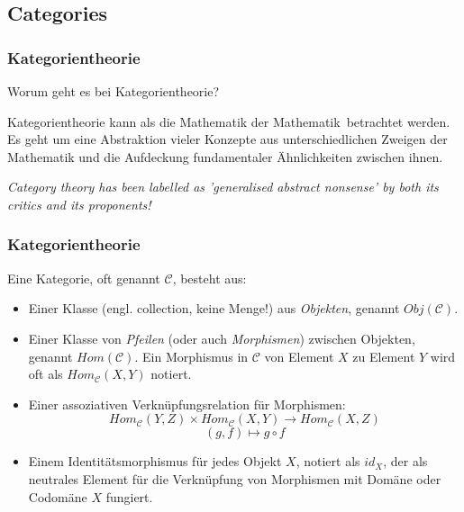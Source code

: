 \documentclass{beamer}
\begin{document}
\subsection*{Categories}

\begin{frame}
\frametitle{Kategorientheorie}

Worum geht es bei Kategorientheorie?
\pause\bigskip

Kategorientheorie kann als die \glqq Mathematik der Mathematik\grqq\ betrachtet werden. Es geht um eine
Abstraktion vieler Konzepte aus unterschiedlichen Zweigen der Mathematik und die Aufdeckung fundamentaler
Ähnlichkeiten zwischen ihnen.
\pause\bigskip

\textit{\glqq Category theory has been labelled as 'generalised abstract nonsense' by both its critics and 
its proponents!\grqq}
\end{frame}


\begin{frame}
\frametitle{Kategorientheorie}

Eine Kategorie, oft genannt $\mathcal{C}$, besteht aus:
\begin{itemize}
\pause\item Einer Klasse (engl. \glqq collection\grqq , keine Menge!) aus \emph{Objekten}, genannt $Obj(\mathcal{C})$.
\pause\item Einer Klasse von \emph{Pfeilen} (oder auch \emph{Morphismen}) zwischen Objekten, genannt $Hom(\mathcal{C})$. Ein Morphismus in $\mathcal{C}$ von Element $X$ zu Element $Y$ wird oft als $Hom_\mathcal{C}(X,Y)$ notiert.
\pause\item Einer assoziativen Verknüpfungsrelation für Morphismen:
$$Hom_\mathcal{C}(Y,Z) \times Hom_\mathcal{C}(X,Y) \to Hom_\mathcal{C}(X,Z)$$
$$(g,f) \mapsto g \circ f$$
\pause\item Einem Identitätsmorphismus für jedes Objekt $X$, notiert als $id_X$, der als neutrales Element für die Verknüpfung von Morphismen mit Domäne oder Codomäne $X$ fungiert.
\end{itemize}
\end{frame}

\end{document}

